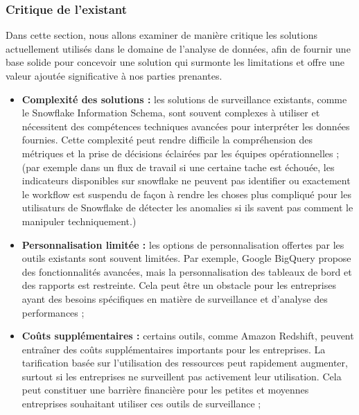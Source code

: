 \subsubsection{Critique de l'existant}
\par Dans cette section, nous allons examiner de manière critique les solutions actuellement utilisés dans le domaine de l'analyse de données, afin de fournir une base solide pour concevoir une solution qui surmonte les limitations et offre une valeur ajoutée significative à nos parties prenantes.
\begin{itemize}
    \item\textbf{Complexité des solutions : }les solutions de surveillance existants, comme le Snowflake Information Schema, sont souvent complexes à utiliser et nécessitent des compétences techniques avancées pour interpréter les données fournies. 
    Cette complexité peut rendre difficile la compréhension des métriques et la prise de décisions éclairées par les équipes opérationnelles ;
    (par exemple dans un flux de travail si une certaine tache est échouée, les indicateurs disponibles sur snowflake ne peuvent pas identifier ou exactement le workflow est suspendu de façon à rendre les choses plus compliqué pour les utilisaturs de Snowflake de détecter les anomalies si ils savent pas comment le manipuler techniquement.)

    \item\textbf{Personnalisation limitée : }les options de personnalisation offertes par les outils existants sont souvent limitées. 
    Par exemple, Google BigQuery propose des fonctionnalités avancées, mais la personnalisation des tableaux de bord et des rapports est restreinte. Cela peut être un obstacle pour les entreprises ayant des besoins spécifiques en matière de surveillance et d'analyse des performances ;

    \item\textbf{Coûts supplémentaires : }certains outils, comme Amazon Redshift, peuvent entraîner des coûts supplémentaires importants pour les entreprises. La tarification basée sur l'utilisation des ressources peut rapidement augmenter, surtout si les entreprises ne surveillent pas activement leur utilisation. Cela peut constituer une barrière financière pour les petites et moyennes entreprises souhaitant utiliser ces outils de surveillance ;

\end{itemize}


